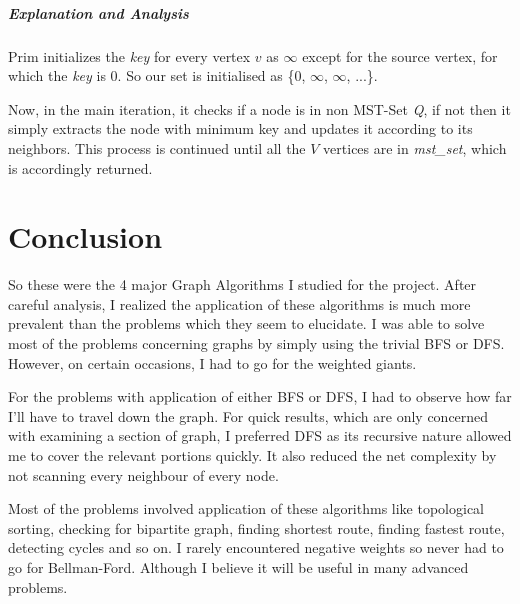 \documentclass[11pt,a4paper]{extarticle}
\begin{document}
\subparagraph{Explanation and Analysis}
Prim initializes the \textit{key} for every vertex $v$ as $\infty$ except for the source vertex, for which the \textit{key} is $0$. So our set is initialised as \{0, $\infty$, $\infty$, ...\}.
\linebreak

Now, in the main iteration, it checks if a node is in non MST-Set \textit{Q}, if not then it simply extracts the node with minimum key and updates it according to its neighbors. This process is continued until all the $V$ vertices are in \textit{mst\_set}, which is accordingly returned.

\section{Conclusion}
So these were the 4 major Graph Algorithms I studied for the project. After careful analysis, I realized the application of these algorithms is much more prevalent than the problems which they seem to elucidate. I was able to solve most of the problems concerning graphs by simply using the trivial BFS or DFS. However, on certain occasions, I had to go for the weighted giants. 

For the problems with application of either BFS or DFS, I had to observe how far I'll have to travel down the graph. For quick results, which are only concerned with examining a section of graph, I preferred DFS as its recursive nature allowed me to cover the relevant portions quickly. It also reduced the net complexity by not scanning every neighbour of every node.

Most of the problems involved application of these algorithms like topological sorting, checking for bipartite graph, finding shortest route, finding fastest route, detecting cycles and so on. I rarely encountered negative weights so never had to go for Bellman-Ford. Although I believe it will be useful in many advanced problems.
\end{document}
